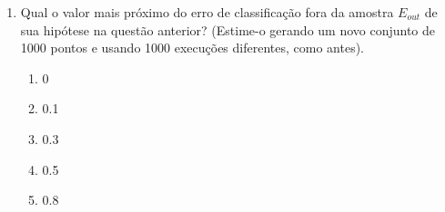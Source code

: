 \begin{enumerate}
    \item Qual o valor mais próximo do erro de classificação fora da amostra $E_{out}$ de sua hipótese na questão anterior? (Estime-o gerando um novo conjunto de 1000 pontos e usando 1000 execuções diferentes, como antes).
    
    \begin{enumerate}
        \item 0
        \item 0.1
        \item 0.3
        \item 0.5
        \item 0.8
    \end{enumerate}


\end{enumerate}


